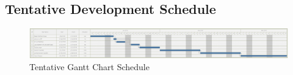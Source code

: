 \documentclass[journal,10pt,draftclsnofoot,onecolumn]{IEEEtran}
\begin{document}
\begin{singlespace}
\begin{landscape}
\section{Tentative Development Schedule}
	\begin{figure}[h]
	\includegraphics[width=9.5in]{gantt.png}
	\caption{Tentative Gantt Chart Schedule}
    \label{fig:Tentative Schedule}
    \end{figure}
\end{landscape}

\nocite{*}




\end{singlespace}
\end{document}
